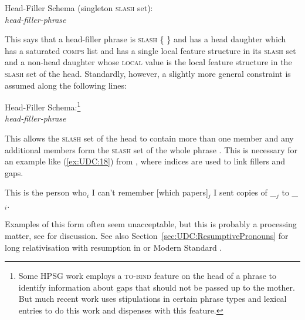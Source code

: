 \documentclass[output=paper,biblatex,babelshorthands,newtxmath,draftmode,colorlinks,citecolor=brown]{langscibook}
\begin{document}
\ea
Head-Filler Schema (singleton \textsc{slash} set):\\
\emph{head-filler-phrase} \impl\\
\z

\noindent
This says that a head-filler phrase is \textsc{slash} \{  \} and has a head
daughter which has a saturated \textsc{comps} list and has a single local feature structure in its
\textsc{slash} set and a non-head daughter whose \textsc{local} value is the local feature
structure in the \textsc{slash} set of the head. Standardly, however, a slightly
more general constraint is assumed along the following lines:

\ea
\label{fig:UDC:17}%
Head-Filler Schema:\footnote{\label{fn-hf-schema}Some HPSG work employs a \textsc{to-bind} feature
  on the head of a phrase to identify information about gaps that
  should not be passed up to the mother. But much recent work uses
  stipulations in certain phrase types and lexical entries to do this
  work and dispenses with this feature.

}\\
\emph{head-filler-phrase} \impl\\
\z

\noindent
This allows the \textsc{slash} set of the head to contain more than one member
and any additional members form the \textsc{slash} set of the whole phrase . This
is necessary for an example like (\ref{ex:UDC:18}) from \citet[473]{Chaves:12}, where indices
are used to link fillers and gaps.

\ea
\label{ex:UDC:18}
This is the person who$_i$ I can't remember [which papers]$_j$ I sent copies of \_$_j$ to \_$_i$.
\z

\noindent
Examples of this form often seem unacceptable, but this is probably a
processing matter, see \citet[Section~3]{Chaves:12} for discussion.
See also Section~\ref{sec:UDC:ResumptivePronouns} for long
relativisation with resumption in  or Modern Standard .
\end{document}
